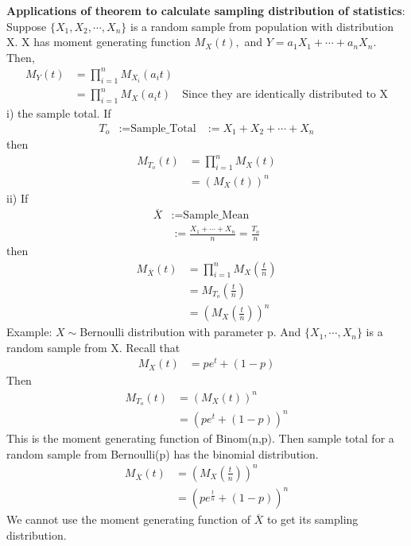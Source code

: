\documentclass[11pt,oneside]{book}
\theoremstyle{break}
\theoremstyle{break}
\newcommand{\example}{\color{WildStrawberry}Example: \color{black}}
\begin{document}
\textbf{Applications of theorem to calculate sampling distribution of statistics}:\\
\text{\qquad} Suppose $\{X_1,X_2,\cdots,X_n\}$ is a random sample from  population with distribution X. X has moment generating function $M_X(t),$ and $Y=a_1X_1+\cdots +a_nX_n$.\\
Then, \begin{align*}
M_{Y}(t)&=\prod_{i=1}^{n}M_{X_i}(a_it)\\
&=\prod_{i=1}^{n}M_{X}(a_it)&\text{Since they are identically distributed to X}
\end{align*}
i) the sample total. If \begin{align*}
T_o&:=\text{Sample\_Total}
&:=X_1+X_2+\cdots +X_n
\end{align*}
then \begin{align*}
M_{T_o}(t)&=\prod_{i=1}^{n}M_X(t)\\
&=\left( M_X(t)\right)^n
\end{align*}
ii) If \begin{align*}
\overline{X}&:=\text{Sample\_Mean}\\
&:=\frac{X_1+\cdots +X_n}{n}=\frac{T_o}{n}
\end{align*}
then \begin{align*}
M_{\overline{X}}(t)&=\prod_{i=1}^{n}M_{X}\left( \frac{t}{n}\right)\\
&=M_{T_o}\left( \frac{t}{n}\right)\\
&=\left( M_{X}\left(\frac{t}{n} \right)\right)^n
\end{align*}
\example $X\sim $Bernoulli distribution with parameter p. And $\{X_1,\cdots,X_n\}$ is a random sample from X. Recall that \begin{align*}
M_{X}(t)&=pe^{t}+(1-p)
\end{align*}
Then \begin{align*}
M_{T_o}(t)&=\left(M_X(t) \right)^n\\
&=\left(pe^t+(1-p) \right)^n
\end{align*}
This is the moment generating function of Binom(n,p). Then sample total for a random sample from Bernoulli(p) has the binomial distribution.\begin{align*}
M_{\overline{X}}(t)&=\left( M_X\left(\frac{t}{n} \right)\right)^n\\
&=\left( pe^{\frac{t}{n}} +(1-p)\right)^n
\end{align*}
We cannot use the moment generating function of $\overline{X}$ to get its sampling distribution.\\
\end{document}
